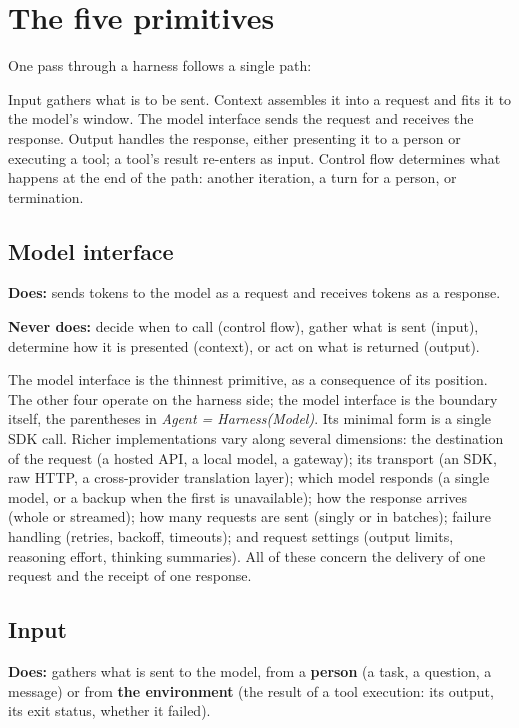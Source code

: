 \section{The five primitives}



One pass through a harness follows a single path:



Input gathers what is to be sent. Context assembles it into a request and fits it to the model's window. The model interface sends the request and receives the response. Output handles the response, either presenting it to a person or executing a tool; a tool's result re-enters as input. Control flow determines what happens at the end of the path: another iteration, a turn for a person, or termination.

\subsection{Model interface}

\textbf{Does:} sends tokens to the model as a request and receives tokens as a response.

\textbf{Never does:} decide when to call (control flow), gather what is sent (input), determine how it is presented (context), or act on what is returned (output).

The model interface is the thinnest primitive, as a consequence of its position. The other four operate on the harness side; the model interface is the boundary itself, the parentheses in \emph{Agent = Harness(Model)}. Its minimal form is a single SDK call. Richer implementations vary along several dimensions: the destination of the request (a hosted API, a local model, a gateway); its transport (an SDK, raw HTTP, a cross-provider translation layer); which model responds (a single model, or a backup when the first is unavailable); how the response arrives (whole or streamed); how many requests are sent (singly or in batches); failure handling (retries, backoff, timeouts); and request settings (output limits, reasoning effort, thinking summaries). All of these concern the delivery of one request and the receipt of one response.

\subsection{Input}

\textbf{Does:} gathers what is sent to the model, from a \textbf{person} (a task, a question, a message) or from \textbf{the environment} (the result of a tool execution: its output, its exit status, whether it failed).

